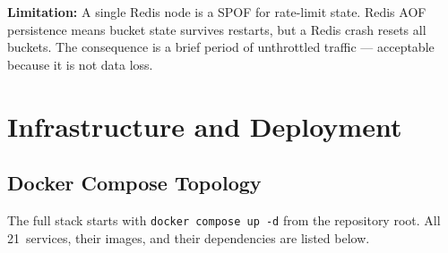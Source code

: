 \documentclass[12pt,a4paper]{article}
\begin{document}
\textbf{Limitation:} A single Redis node is a SPOF for rate-limit state. Redis AOF persistence means bucket state survives restarts, but a Redis crash resets all buckets. The consequence is a brief period of unthrottled traffic --- acceptable because it is not data loss.

\section{Infrastructure and Deployment}

\subsection{Docker Compose Topology}

The full stack starts with \texttt{docker compose up -d} from the repository root. All 21~services, their images, and their dependencies are listed below.
\end{document}
